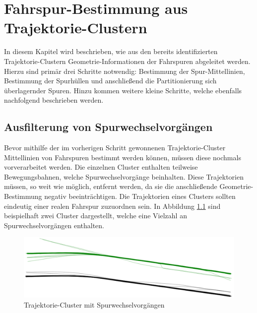 
\chapter{Fahrspur-Bestimmung aus Trajektorie-Clustern}
\label{cha:lane_definition}

In diesem Kapitel wird beschrieben, wie aus den bereits identifizierten Trajektorie-Clustern
Geometrie-Informationen der Fahrspuren abgeleitet werden. Hierzu sind primär drei Schritte notwendig:
Bestimmung der Spur-Mittellinien, Bestimmung der Spurhüllen und anschließend die Partitionierung sich überlagernder
Spuren. Hinzu kommen weitere kleine Schritte, welche ebenfalls nachfolgend beschrieben werden.

\section{Ausfilterung von Spurwechselvorgängen}
\label{sec:real2_filter_lane_change}

Bevor mithilfe der im vorherigen Schritt gewonnenen Trajektorie-Cluster Mittellinien von Fahrspuren bestimmt
werden können, müssen diese nochmals vorverarbeitet werden. Die einzelnen Cluster enthalten teilweise
Bewegungsbahnen, welche Spurwechselvorgänge beinhalten. Diese Trajektorien müssen, so weit wie möglich,
entfernt werden, da sie die anschließende Geometrie-Bestimmung negativ beeinträchtigen. Die Trajektorien
eines Clusters sollten eindeutig einer realen Fahrspur zuzuordnen sein. In Abbildung
\ref{fig:real2_clusters_pre_postpro} sind beispielhaft zwei Cluster dargestellt, welche eine Vielzahl an
Spurwechselvorgängen enthalten.

\begin{figure}[H]
    \centering
    \includegraphics[width=0.8\linewidth]{../resources/img/umsetzung/U2/Clusters_Pre_Postprocessing}
    \caption{Trajektorie-Cluster mit Spurwechselvorgängen}
    \label{fig:real2_clusters_pre_postpro}
\end{figure}

